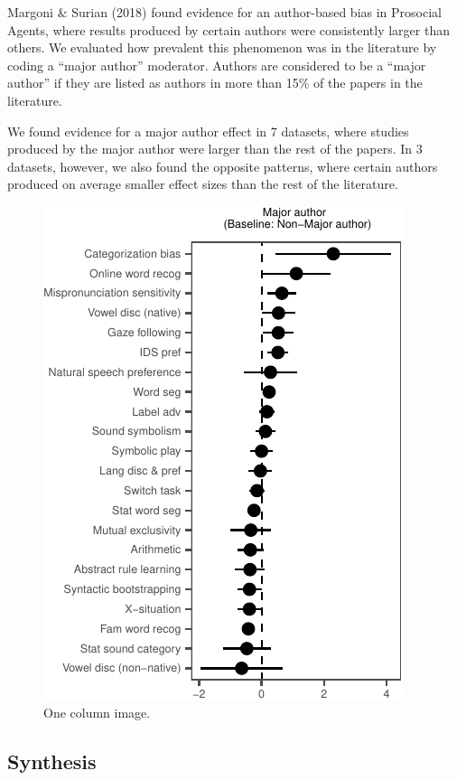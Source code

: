 \documentclass[10pt, letterpaper]{article}
\newenvironment{CodeChunk}{}{}
\begin{document}
Margoni \& Surian (2018) found evidence for an author-based bias in
Prosocial Agents, where results produced by certain authors were
consistently larger than others. We evaluated how prevalent this
phenomenon was in the literature by coding a ``major author'' moderator.
Authors are considered to be a ``major author'' if they are listed as
authors in more than 15\% of the papers in the literature.

We found evidence for a major author effect in 7 datasets, where studies
produced by the major author were larger than the rest of the papers. In
3 datasets, however, we also found the opposite patterns, where certain
authors produced on average smaller effect sizes than the rest of the
literature.

\begin{CodeChunk}
\begin{figure}[H]

{\centering \includegraphics{figs/image-1} 

}

\caption[One column image]{One column image.}\label{fig:image}
\end{figure}
\end{CodeChunk}

\hypertarget{synthesis}{%
\subsection{Synthesis}\label{synthesis}}
\end{document}

